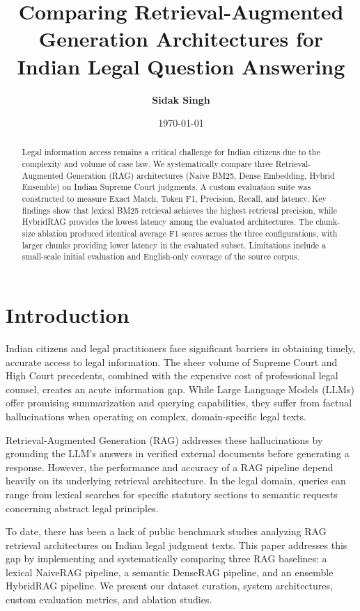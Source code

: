 \documentclass[11pt]{article}
\title{\textbf{Comparing Retrieval-Augmented Generation Architectures for Indian Legal Question Answering}}
\author{\textbf{Sidak Singh}}
\date{\today}
\begin{document}
\maketitle

\begin{abstract}

Legal information access remains a critical challenge for Indian citizens due to the complexity and volume of case law. We systematically compare three Retrieval-Augmented Generation (RAG) architectures (Naive BM25, Dense Embedding, Hybrid Ensemble) on Indian Supreme Court judgments. A custom evaluation suite was constructed to measure Exact Match, Token F1, Precision\@k, Recall\@k, and latency. Key findings show that lexical BM25 retrieval achieves the highest retrieval precision, while HybridRAG provides the lowest latency among the evaluated architectures. The chunk-size ablation produced identical average F1 scores across the three configurations, with larger chunks providing lower latency in the evaluated subset. Limitations include a small-scale initial evaluation and English-only coverage of the source corpus.

\end{abstract}

\section{Introduction}

Indian citizens and legal practitioners face significant barriers in obtaining timely, accurate access to legal information. The sheer volume of Supreme Court and High Court precedents, combined with the expensive cost of professional legal counsel, creates an acute information gap. While Large Language Models (LLMs) offer promising summarization and querying capabilities, they suffer from factual hallucinations when operating on complex, domain-specific legal texts.

Retrieval-Augmented Generation (RAG) addresses these hallucinations by grounding the LLM's answers in verified external documents before generating a response. However, the performance and accuracy of a RAG pipeline depend heavily on its underlying retrieval architecture. In the legal domain, queries can range from lexical searches for specific statutory sections to semantic requests concerning abstract legal principles.

To date, there has been a lack of public benchmark studies analyzing RAG retrieval architectures on Indian legal judgment texts. This paper addresses this gap by implementing and systematically comparing three RAG baselines: a lexical NaiveRAG pipeline, a semantic DenseRAG pipeline, and an ensemble HybridRAG pipeline. We present our dataset curation, system architectures, custom evaluation metrics, and ablation studies.
\end{document}

